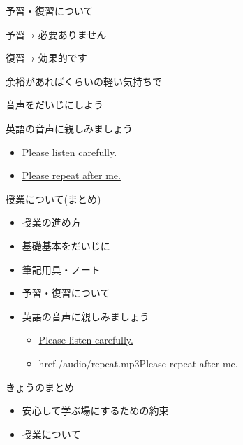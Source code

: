 \documentclass[
  ignorenonframetext,
  aspectratio=169,
  xcolor=dvipsnames]{beamer}
\providecommand{\tightlist}{%
  \setlength{\itemsep}{0pt}\setlength{\parskip}{0pt}}
\begin{document}
\begin{frame}{予習・復習について}
\label{ux4e88ux7fd2ux5fa9ux7fd2ux306bux3064ux3044ux3066}
\LARGE

予習\pause → 必要ありません

\pause

\bigskip

復習\pause → 効果的です

\phantom{　　　　}余裕があればくらいの軽い気持ちで
\end{frame}

\begin{frame}{音声をだいじにしよう}
\label{ux97f3ux58f0ux3092ux3060ux3044ux3058ux306bux3057ux3088ux3046}
\LARGE

英語の音声に親しみましょう

\begin{itemize}[<+->]
\tightlist
\item
  \href{./audio/listen.mp3}{Please listen carefully.}
\item
  \href{./audio/repeat.mp3}{Please repeat after me.}
\end{itemize}
\end{frame}

\begin{frame}{授業について(まとめ)}
\label{ux6388ux696dux306bux3064ux3044ux3066ux307eux3068ux3081}
\Large

\begin{itemize}
\item 授業の進め方
\item 基礎基本をだいじに
\item 筆記用具・ノート
\item 予習・復習について
\item 英語の音声に親しみましょう
      \begin{itemize}
         \item  \href{./audio/listen.mp3}{Please listen carefully.}
         \item  href{./audio/repeat.mp3}{Please repeat after me.}
      \end{itemize}
\end{itemize}
\end{frame}

\begin{frame}{きょうのまとめ}
\label{ux304dux3087ux3046ux306eux307eux3068ux3081}
\LARGE

\begin{itemize}
\item  安心して学ぶ場にするための約束
\item  授業について
\end{itemize}
\end{frame}
\end{document}
